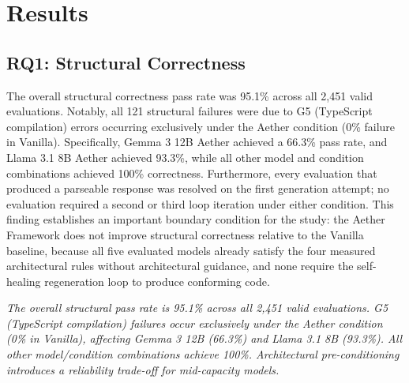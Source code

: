 \documentclass[review,12pt,3p]{elsarticle}
\begin{document}
\section{Results}
\label{sec:results}

\subsection{RQ1: Structural Correctness}

The overall structural correctness pass rate was 95.1\% across all 2,451 valid evaluations. Notably, all 121 structural failures were due to G5 (TypeScript compilation) errors occurring exclusively under the Aether condition (0\% failure in Vanilla). Specifically, Gemma 3 12B Aether achieved a 66.3\% pass rate, and Llama 3.1 8B Aether achieved 93.3\%, while all other model and condition combinations achieved 100\% correctness. Furthermore, every evaluation that produced a parseable response was
resolved on the first generation attempt; no evaluation required a second or third loop
iteration under either condition. This finding establishes an important boundary condition
for the study: the Aether Framework does not improve structural correctness relative to the
Vanilla baseline, because all five evaluated models already satisfy the
four measured architectural rules without architectural guidance, and none require
the self-healing regeneration loop to produce conforming code.

\begin{tcolorbox}[
  colback=gray!10,
  colframe=black!60,
  title=\textbf{RQ1 Summary},
  fonttitle=\bfseries,
  breakable
]
\textit{The overall structural pass rate is 95.1\% across all 2,451 valid evaluations. G5 (TypeScript compilation) failures occur exclusively under the Aether condition (0\% in Vanilla), affecting Gemma 3 12B (66.3\%) and Llama 3.1 8B (93.3\%). All other model/condition combinations achieve 100\%. Architectural pre-conditioning introduces a reliability trade-off for mid-capacity models.}
\end{tcolorbox}
\end{document}
